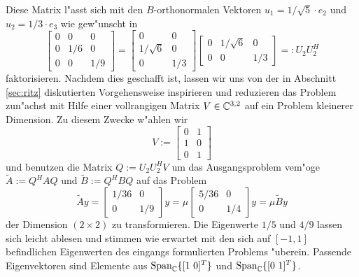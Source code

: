 Diese Matrix l"asst sich mit den $B$-orthonormalen Vektoren $u_1 = 1/\sqrt5 \cdot e_2$
und $u_2 = 1/3\cdot e_3$ wie gew"unscht in
\[
\begin{bmatrix} 0 & 0 & 0 \\ 0 & 1/6 & 0 \\ 0 & 0 & 1/9 \end{bmatrix}
= \begin{bmatrix} 0 & 0  \\ 1/\sqrt6 & 0  \\ 0 & 1/3  \end{bmatrix}
\begin{bmatrix} 0 & 1/\sqrt6 & 0 \\ 0 & 0 & 1/3 \end{bmatrix} =: U_2 U_2^H
\]
faktorisieren. Nachdem dies geschafft ist, lassen wir uns von der in Abschnitt \ref{sec:ritz} diskutierten Vorgehensweise inspirieren und reduzieren das Problem zun"achst mit
Hilfe einer vollrangigen Matrix $V\in\mathbb{C}^{3,2}$ auf ein Problem kleinerer Dimension.
Zu diesem Zwecke w"ahlen wir
\[
V:=\begin{bmatrix} 0 & 1 \\ 1 & 0 \\ 0 & 1\end{bmatrix}
\]
und benutzen die Matrix $Q:=U_2 U_2^H V$ um das Ausgangsproblem vem"oge
$\widetilde{A}:= Q^H A Q$ und $\widetilde{B}:=Q^H B Q$ auf das Problem
\[
\widetilde{A}y = \begin{bmatrix}1/36 & 0\\0 & 1/9 \end{bmatrix} y = \mu \begin{bmatrix}5/36 & 0\\0 & 1/4 \end{bmatrix} y = \mu \widetilde{B}y
\]
der Dimension $(2\times 2)$ zu transformieren. Die Eigenwerte $1/5$ und $4/9$ lassen sich leicht ablesen
und stimmen wie erwartet mit den sich auf $[-1,1]$ befindlichen Eigenwerten des eingangs formulierten Problems "uberein. Passende Eigenvektoren sind
Elemente aus $\text{Span}_{\mathbb{C}} \{[1 \ 0]^T\}$ und $\text{Span}_{\mathbb{C}} \{[0 \ 1]^T\}$.\\

